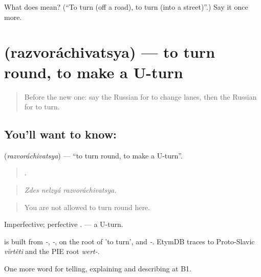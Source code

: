 \begin{tcolorbox}[breakable,colback=teal!4,colframe=teal!35!black,title={Before you move on}]
What does  mean? (\textquotedblleft{}To turn (off a road), to turn (into a street)\textquotedblright{}.) Say it once more.
\end{tcolorbox}
\section[\texorpdfstring{\ru{разворачиваться} (razvoráchivatsya)}{разворачиваться (razvoráchivatsya)}]{ (razvoráchivatsya) — to turn round, to make a U-turn}

\label{lesson:RU-C407-razvorachivatsya}



\begin{quote}
Before the new one: say the Russian for to change lanes, then the Russian for to turn.
\end{quote}

\subsection*{You'll want to know: }
\textbf{} (\emph{razvoráchivatsya}) — \textquotedblleft{}to turn round, to make a U-turn\textquotedblright{}.

\begin{quote}
  .
\end{quote}

\begin{quote}
\emph{Zdes nelzyá razvoráchivatsya.}
\end{quote}

\begin{quote}
You are not allowed to turn round here.
\end{quote}

Imperfective; perfective \emph{}. \emph{} — a U-turn.

\begin{cousinweb}
\emph{} is built from \emph{-}, \emph{-}, on the root of \emph{} 'to turn', and \emph{-}. EtymDB traces \emph{} to Proto-Slavic \emph{vĭrtěti} and the PIE root \emph{wert-}.
\end{cousinweb}

\begin{grammarlens}[title={What you've built}]
One more word for telling, explaining and describing at B1.
\end{grammarlens}

